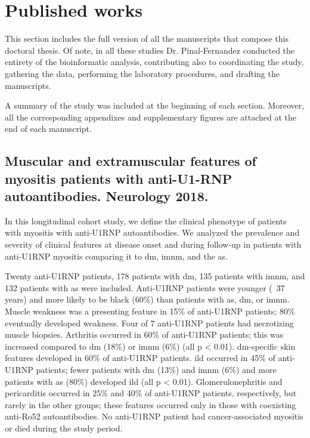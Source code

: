 \appendix
\chapter{Published works}
\label{chap:appendix}
This section includes the full version of all the manuscripts that compose this doctoral thesis. Of note, in all these studies Dr. Pinal-Fernandez conducted the entirety of the bioinformatic analysis, contributing also to coordinating the study, gathering the data, performing the laboratory procedures, and drafting the manuscripts.

A summary of the study was included at the beginning of each section. Moreover, all the corresponding appendixes and supplementary figures are attached at the end of each manuscript.

{\cleardoublepage}

\section{Muscular and extramuscular features of myositis patients with anti-U1-RNP autoantibodies. Neurology 2018.}
\label{sec:u1rnp}
In this longitudinal cohort study, we define the clinical phenotype of patients with myositis with anti-U1RNP autoantibodies. We analyzed the prevalence and severity of clinical features at disease onset and during follow-up in patients with anti-U1RNP myositis comparing it to \gls{dm}, \gls{imnm}, and the \gls{as}.

Twenty anti-U1RNP patients, 178 patients with \gls{dm}, 135 patients with \gls{imnm}, and 132 patients with \gls{as} were included. Anti-U1RNP patients were younger (~37 years) and more likely to be black (60\%) than patients with \gls{as}, \gls{dm}, or \gls{imnm}. Muscle weakness was a presenting feature in 15\% of anti-U1RNP patients; 80\% eventually developed weakness. Four of 7 anti-U1RNP patients had necrotizing muscle biopsies. Arthritis occurred in 60\% of anti-U1RNP patients; this was increased compared to \gls{dm} (18\%) or \gls{imnm} (6\%) (all p < 0.01). \gls{dm}-specific skin features developed in 60\% of anti-U1RNP patients. \gls{ild} occurred in 45\% of anti-U1RNP patients; fewer patients with \gls{dm} (13\%) and \gls{imnm} (6\%) and more patients with \gls{as} (80\%) developed \gls{ild} (all p < 0.01). Glomerulonephritis and pericarditis occurred in 25\% and 40\% of anti-U1RNP patients, respectively, but rarely in the other groups; these features occurred only in those with coexisting anti-Ro52 autoantibodies. No anti-U1RNP patient had cancer-associated myositis or died during the study period.

